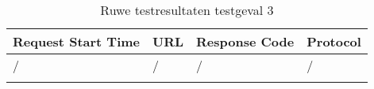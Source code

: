 \begin{longtable}[c]{@{}llll@{}}
    \toprule
    Request Start Time & URL & Response Code & Protocol \\* \midrule
    \endhead
    / & / & / & / \\* \bottomrule
    \caption{Ruwe testresultaten testgeval 3}
    \label{tab:rawresults3}\\
\end{longtable}